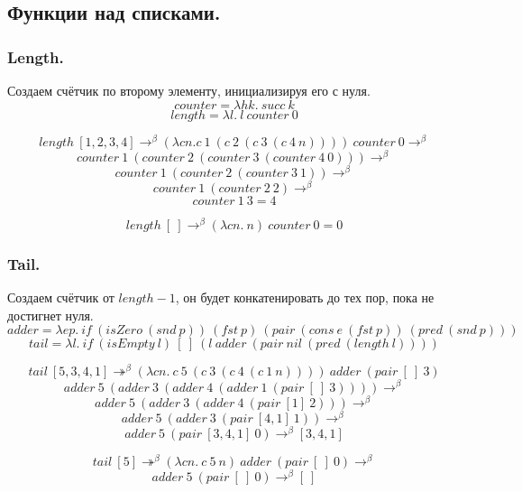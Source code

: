 \documentclass[a4paper,12pt]{article}
\theoremstyle{plain} %
\theoremstyle{definition} %
\theoremstyle{remark} %
\begin{document}
\subsection{Функции над списками.}

\subsubsection{Length.}
Создаем счётчик по второму элементу, инициализируя его с нуля.
$$counter = \lambda h k. \ succ \ k$$
$$length = \lambda l. \ l \ counter \ 0$$

$$length \ [1, 2, 3, 4] \rightarrow^{\beta} (\lambda cn. c \ 1 \ (c \ 2 \ (c \ 3 \ (c \ 4 \ n)))) \ counter \ 0 \rightarrow^{\beta}$$
$$counter \ 1 \ (counter \ 2 \ (counter \ 3 \ (counter \ 4 \ 0))) \rightarrow^{\beta}$$
$$counter \ 1 \ (counter \ 2 \ (counter \ 3 \ 1)) \rightarrow^{\beta}$$
$$counter \ 1 \ (counter \ 2 \ 2) \rightarrow^{\beta}$$
$$counter \ 1 \ 3 = 4$$

$$length \ [ \ ] \rightarrow^{\beta} (\lambda cn. \ n) \ counter \ 0 = 0$$

\subsubsection{Tail.}
Создаем счётчик от $length - 1$, он будет конкатенировать до тех пор, пока не достигнет нуля.
$$adder = \lambda e p. \ if \ (isZero \ (snd \ p)) \ (fst \ p) \  (pair \ (cons \ e \ (fst \ p)) \ (pred \ (snd \ p)))$$
$$tail = \lambda l. \ if \ (isEmpty \ l) \ [ \ ] \ ( l \ adder \ (pair \ nil \ (pred \  (length \ l)))) $$

$$tail \ [5, 3, 4, 1] \twoheadrightarrow^{\beta} (\lambda c n. \ c \ 5 \ (c \ 3 \ (c \ 4 \ (c \ 1 \ n)))) \  adder \ (pair \ [ \ ] \ 3)$$
$$ adder \ 5 \ (adder \ 3 \ (adder \ 4 \ (adder \ 1 \ (pair \ [ \ ] \ 3)))) \rightarrow^{\beta}$$
$$ adder \ 5 \ (adder \ 3 \ (adder \ 4 \ (pair \ [ 1 ] \ 2))) \rightarrow^{\beta}$$
$$ adder \ 5 \ (adder \ 3 \ (pair \ [ 4, 1 ] \ 1)) \rightarrow^{\beta}$$
$$ adder \ 5 \ (pair \ [ 3, 4, 1 ] \ 0) \rightarrow^{\beta} [ 3, 4, 1 ]$$

$$tail \ [5] \twoheadrightarrow^{\beta} (\lambda c n. \ c \ 5 \ n) \  adder \ (pair \ [ \ ] \ 0) \rightarrow^{\beta}$$
$$adder \ 5 \ (pair \ [ \ ] \ 0) \rightarrow^{\beta} [ \ ]$$
\end{document}
